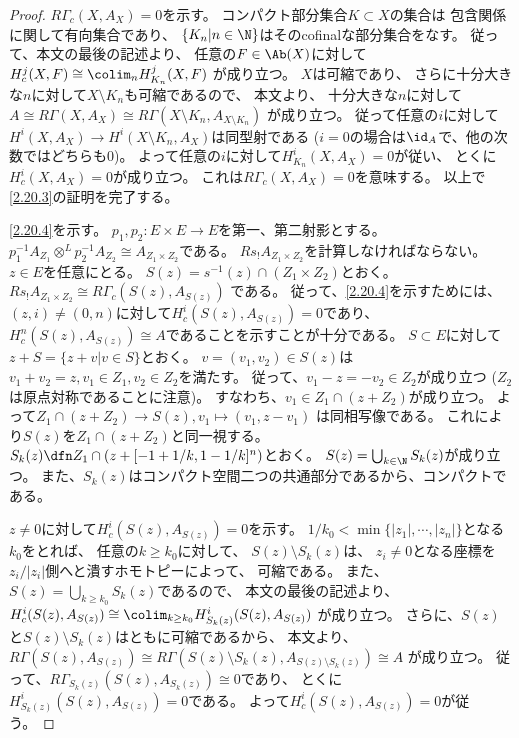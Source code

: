 \documentclass[uplatex,dvipdfmx]{jsarticle}
\begin{document}
\begin{proof}
  \(R\Gamma_c(X,A_X) = 0\)を示す。
  コンパクト部分集合\(K\subset X\)の集合は
  包含関係に関して有向集合であり、
  \(\{K_n | n\in \N\}\)はそのcofinalな部分集合をなす。
  従って、本文\cite[Notations 2.6.8]{kashiwara2002sheaves}の最後の記述より、
  任意の\(F\in \Ab(X)\)に対して
  \(H^j_c(X,F)\cong \colim_n H^j_{K_n}(X,F)\)
  が成り立つ。
  \(X\)は可縮であり、
  さらに十分大きな\(n\)に対して\(X\setminus K_n\)も可縮であるので、
  本文\cite[Corollary 2.7.7 (iii)]{kashiwara2002sheaves}より、
  十分大きな\(n\)に対して
  \(A\cong R\Gamma(X,A_X)\cong R\Gamma(X\setminus K_n, A_{X\setminus K_n})\)
  が成り立つ。
  従って任意の\(i\)に対して
  \(H^i(X,A_X) \to H^i(X\setminus K_n, A_X)\)は同型射である
  (\(i=0\)の場合は\(\id_A\)で、他の次数ではどちらも\(0\))。
  よって任意の\(i\)に対して\(H^i_{K_n}(X,A_X)=0\)が従い、
  とくに\(H^i_c(X,A_X)=0\)が成り立つ。
  これは\(R\Gamma_c(X,A_X)=0\)を意味する。
  以上で\ref{2.20.3}の証明を完了する。

  \ref{2.20.4}を示す。
  \(p_1,p_2:E\times E\to E\)を第一、第二射影とする。
  \(p_1^{-1}A_{Z_1}\otimes^L p_2^{-1}A_{Z_2}\cong A_{Z_1\times Z_2}\)である。
  \(Rs_!A_{Z_1\times Z_2}\)を計算しなければならない。
  \(z\in E\)を任意にとる。
  \(S(z) = s^{-1}(z)\cap (Z_1\times Z_2)\)とおく。
  \(Rs_!A_{Z_1\times Z_2}\cong R\Gamma_c(S(z),A_{S(z)})\)
  である。
  従って、\ref{2.20.4}を示すためには、
  \((z,i)\neq (0,n)\)に対して\(H^i_c(S(z),A_{S(z)}) = 0\)であり、
  \(H^n_c(S(z),A_{S(z)})\cong A\)であることを示すことが十分である。
  \(S\subset E\)に対して
  \(z+S = \{z+v | v\in S\}\)とおく。
  \(v = (v_1,v_2)\in S(z)\)は
  \(v_1+v_2 = z, v_1\in Z_1,v_2\in Z_2\)を満たす。
  従って、\(v_1-z = -v_2 \in Z_2\)が成り立つ
  (\(Z_2\)は原点対称であることに注意)。
  すなわち、\(v_1\in Z_1\cap (z+Z_2)\)が成り立つ。
  よって\(Z_1\cap (z+Z_2) \to S(z), v_1\mapsto (v_1,z-v_1)\)
  は同相写像である。
  これにより\(S(z)\)を\(Z_1\cap (z+Z_2)\)と同一視する。
  \(S_k(z) \dfn Z_1\cap (z+[-1+1/k,1-1/k]^n)\)とおく。
  \(S(z) = \bigcup_{k\in \N}S_k(z)\)が成り立つ。
  また、\(S_k(z)\)はコンパクト空間二つの共通部分であるから、コンパクトである。

  \(z\neq 0\)に対して\(H^i_c(S(z),A_{S(z)})=0\)を示す。
  \(1/k_0 < \min\{|z_1|,\cdots,|z_n|\}\)となる\(k_0\)をとれば、
  任意の\(k \geq k_0\)に対して、
  \(S(z)\setminus S_k(z)\)は、
  \(z_i\neq 0\)となる座標を\(z_i/|z_i|\)側へと潰すホモトピーによって、
  可縮である。
  また、\(S(z) = \bigcup_{k\geq k_0}S_k(z)\)であるので、
  本文\cite[Notations 2.6.8]{kashiwara2002sheaves}の最後の記述より、
  \(H^i_c(S(z),A_{S(z)}) \cong \colim_{k\geq k_0} H^i_{S_k(z)}(S(z),A_{S(z)})\)
  が成り立つ。
  さらに、\(S(z)\)と\(S(z)\setminus S_k(z)\)はともに可縮であるから、
  本文\cite[Corollary 2.7.7 (iii)]{kashiwara2002sheaves}より、
  \(R\Gamma(S(z),A_{S(z)})\cong
  R\Gamma(S(z)\setminus S_k(z),A_{S(z)\setminus S_k(z)})\cong A\)
  が成り立つ。
  従って、\(R\Gamma_{S_k(z)}(S(z),A_{S_k(z)})\cong 0\)であり、
  とくに\(H^i_{S_k(z)}(S(z),A_{S(z)}) = 0\)である。
  よって\(H^i_c(S(z),A_{S(z)}) = 0\)が従う。


\end{proof}
\end{document}
